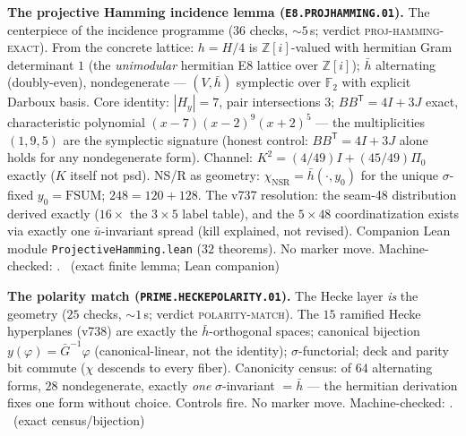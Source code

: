 \documentclass[11pt,a4paper]{article}
\newcommand{\Z}{\mathbb{Z}}
\theoremstyle{definition}
\begin{document}
\par\smallskip\noindent\textbf{The projective Hamming incidence lemma
(\texttt{E8.PROJHAMMING.01}).}
The centerpiece of the incidence programme ($36$ checks,
${\sim}5$\,s; verdict \textsc{proj-hamming-exact}).  From the
concrete lattice: $h=H/4$ is $\Z[i]$-valued with hermitian Gram
determinant $1$ (the \emph{unimodular} hermitian E8 lattice over
$\Z[i]$); $\bar h$ alternating (doubly-even), nondegenerate ---
$(V,\bar h)$ symplectic over $\mathbb{F}_2$ with explicit Darboux
basis.  Core identity: $|H_y|=7$, pair intersections $3$;
$BB^{\mathsf T}=4I+3J$ exact, characteristic polynomial
$(x-7)(x-2)^9(x+2)^5$ --- the multiplicities $(1,9,5)$ are the
symplectic signature (honest control: $BB^{\mathsf T}=4I+3J$ alone
holds for any nondegenerate form).  Channel:
$K^2=(4/49)I+(45/49)\Pi_0$ exactly ($K$ itself not psd).  NS/R as
geometry: $\chi_{\mathrm{NSR}}=\bar h(\cdot,y_0)$ for the unique
$\sigma$-fixed $y_0=\mathrm{FSUM}$; $248=120+128$.  The v737
resolution: the seam-48 distribution derived exactly ($16\times$
the $3\times5$ label table), and the $5\times48$ coordinatization
exists via exactly one $\bar u$-invariant spread (kill explained,
not revised).  Companion Lean module
\texttt{ProjectiveHamming.lean} ($32$ theorems).  No marker move.
Machine-checked: .
\mE\ (exact finite lemma; Lean companion)
\par\smallskip

\par\smallskip\noindent\textbf{The polarity match
(\texttt{PRIME.HECKEPOLARITY.01}).}
The Hecke layer \emph{is} the geometry ($25$ checks, ${\sim}1$\,s;
verdict \textsc{polarity-match}).  The $15$ ramified Hecke
hyperplanes (v738) are exactly the $\bar h$-orthogonal spaces;
canonical bijection $y(\varphi)=\bar G^{-1}\varphi$
(canonical-linear, not the identity); $\sigma$-functorial; deck and
parity bit commute ($\chi$ descends to every fiber).  Canonicity
census: of $64$ alternating forms, $28$ nondegenerate, exactly
\emph{one} $\sigma$-invariant $=\bar h$ --- the hermitian
derivation fixes one form without choice.  Controls fire.  No
marker move.
Machine-checked: .
\mE\ (exact census/bijection)
\par\smallskip
\end{document}
